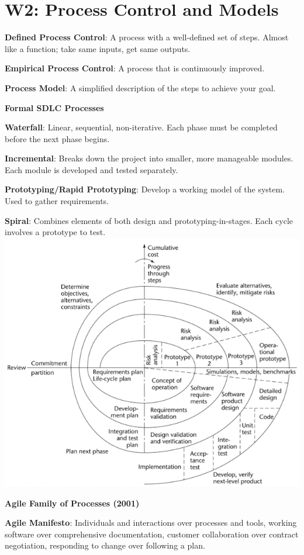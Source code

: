 \section{W2: Process Control and Models}

\textbf{Defined Process Control}: A process with a well-defined set of steps. Almost like a function; take same inputs, get same outputs.

\textbf{Empirical Process Control}: A process that is continuously improved.

\textbf{Process Model}: A simplified description of the steps to achieve your goal.

\textbf{Formal SDLC Processes}

    \textbf{Waterfall}: Linear, sequential, non-iterative. Each phase must be completed before the next phase begins.

    \textbf{Incremental}: Breaks down the project into smaller, more manageable modules. Each module is developed and tested separately.

    \textbf{Prototyping/Rapid Prototyping}: Develop a working model of the system. Used to gather requirements.

    \textbf{Spiral}: Combines elements of both design and prototyping-in-stages. Each cycle involves a prototype to test.
    \includegraphics[width=\linewidth]{figs/SCR-20240605-oywi.png}


\textbf{Agile Family of Processes (2001)}

    \textbf{Agile Manifesto}: Individuals and interactions over processes and tools, working software over comprehensive documentation, customer collaboration over contract negotiation, responding to change over following a plan.

